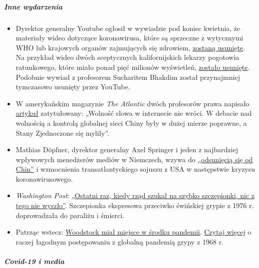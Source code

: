 \hypertarget{inne-wydarzenia}{%
\subparagraph{\texorpdfstring{\textbf{Inne
wydarzenia}}{Inne wydarzenia}}\label{inne-wydarzenia}}

\begin{itemize}
\tightlist
\item
  Dyrektor generalny Youtube ogłosił w wywiadzie pod koniec kwietnia, że
  materiały wideo dotyczące koronawirusa, które są sprzeczne z
  wytycznymi WHO lub krajowych organów zajmujących się zdrowiem,
  \href{https://www.businessinsider.com/youtube-will-ban-anything-against-who-guidance-2020-4}{zostaną
  usunięte}. Na przykład wideo dwóch sceptycznych kalifornijskich
  lekarzy pogotowia ratunkowego, które miało ponad pięć milionów
  wyświetleń,
  \href{https://www.turnto23.com/news/coronavirus/video-interview-with-dr-dan-erickson-and-dr-artin-massihi-taken-down-from-youtube}{zostało
  usunięte}. Podobnie wywiad z profesorem Sucharitem Bhakdim został
  przynajmniej tymczasowo usunięty przez YouTube.
\item
  W amerykańskim magazynie \emph{The Atlantic} dwóch profesorów prawa
  napisało
  \href{https://www.theatlantic.com/ideas/archive/2020/04/what-covid-revealed-about-internet/610549/}{artykuł}
  zatytułowany: „Wolność słowa w internecie nie wróci. W debacie nad
  wolnością a kontrolą globalnej sieci Chiny były w dużej mierze
  poprawne, a Stany Zjednoczone się myliły''.
\item
  Mathias Döpfner, dyrektor generalny Axel Springer i jeden z
  najbardziej wpływowych menedżerów mediów w Niemczech, wzywa do
  \href{https://www.german-foreign-policy.com/news/detail/8263/}{„odsunięcią
  się od Chin''} i wzmocnienia transatlantyckiego sojuszu z USA w
  następstwie kryzysu koronawirusowego.
\item
  \emph{Washington Post}:
  \href{https://www.washingtonpost.com/history/2020/05/01/vaccine-swine-flu-coronavirus/}{„Ostatni
  raz, kiedy rząd szukał na szybko szczepionki, nic z tego nie
  wyszło''}. Szczepionka ekspresowa przeciwko świńskiej grypie z 1976 r.
  doprowadzała do paraliżu i śmierci.
\item
  Patrząc wstecz:
  \href{https://www.aier.org/article/woodstock-occurred-in-the-middle-of-a-pandemic/}{Woodstock
  miał miejsce w środku pandemii}.
  \href{https://www.britannica.com/event/Hong-Kong-flu-of-1968}{Czytaj
  więcej} o raczej łagodnym postępowaniu z globalną pandemią grypy z
  1968 r.
\end{itemize}

\hypertarget{covid-19-i-media}{%
\subparagraph{\texorpdfstring{\textbf{Covid-19 i
media}}{Covid-19 i media}}\label{covid-19-i-media}}

